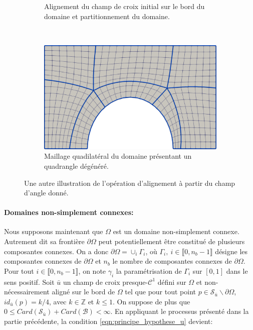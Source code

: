 \begin{figure}[!h]
\begin{subfigure}{0.58\textwidth}
    \caption{Alignement du champ de croix initial sur le bord du domaine et partitionnement du domaine.}
    \label{fig:rect_demi_disc_second}
\end{subfigure}
\\[0.46cm]
\begin{subfigure}{0.58\textwidth}
    \includegraphics[width=\textwidth]{images/rect_demi_disc_third.pdf}
    \caption{Maillage quadilatéral du domaine présentant un quadrangle dégénéré.}
    \label{fig:rect_demi_disc_third}
\end{subfigure}
\caption{Une autre illustration de l'opération d'alignement à partir du champ d'angle donné.}
\label{fig:rect_demi_disc}
\end{figure}

\paragraph{Domaines non-simplement connexes:}
Nous supposons maintenant que $\Omega$ est un domaine non-simplement connexe. Autrement dit sa frontière $\partial\Omega$ peut potentiellement être constitué de plusieurs composantes connexes. On a donc $\partial\Omega=\cup_i\Gamma_i$, où $\Gamma_i,~i\in\llbracket 0, n_b-1\rrbracket$ désigne les composantes connexes de $\partial\Omega$ et $n_b$ le nombre de composantes connexes de $\partial\Omega$. Pour tout $i\in\llbracket0, n_b-1\rrbracket$, on note $\gamma_i$ la paramétrisation de $\Gamma_i$ sur $[0, 1]$ dans le sens positif. Soit $\bar{u}$ un champ de croix presque-$\mathcal{C}^1$ défini sur $\Omega$ et non-nécessairement aligné sur le bord de $\Omega$ tel que pour tout point $p\in\mathcal{S}_{\bar{u}}\backslash\partial\Omega$, $id_{\bar{u}}(p)=k/4$, avec $k\in\mathbb{Z}$ et $k\leq 1$. On suppose de plus que $0\leq Card(\mathcal{S}_{\bar{u}})+Card(\mathcal{B})< \infty$. En appliquant le processus présenté dans la partie précédente, la condition \eqref{eqn:principe_hypothese_u} devient:

